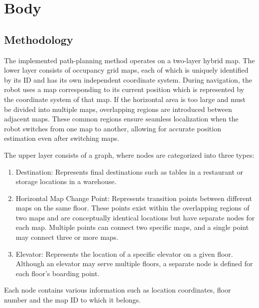 \documentclass[en]{snu-cse-bsc-thesis}
\begin{document}



\chapter{Body}\label{chap:body}

\section{Methodology}\label{sec:Methodology}
The implemented path-planning method operates on a two-layer hybrid map. 
The lower layer consists of occupancy grid maps, each of which is uniquely identified by its ID and has its own independent coordinate system. 
During navigation, the robot uses a map corresponding to its current position which is represented by the coordinate system of that map. 
If the horizontal area is too large and must be divided into multiple maps, overlapping regions are introduced between adjacent maps. 
These common regions ensure seamless localization when the robot switches from one map to another, allowing for accurate position estimation even after switching maps.

The upper layer consists of a graph, where nodes are categorized into three types:
\begin{enumerate}
  \item Destination: Represents final destinations such as tables in a restaurant or storage locations in a warehouse.
  \item Horizontal Map Change Point: Represents transition points between different maps on the same floor. These points exist within the overlapping regions of two maps and are conceptually identical locations but have separate nodes for each map. Multiple points can connect two specific maps, and a single point may connect three or more maps.
  \item Elevator: Represents the location of a specific elevator on a given floor. Although an elevator may serve multiple floors, a separate node is defined for each floor's boarding point.
\end{enumerate}
Each node contains various information such as location coordinates, floor number and the map ID to which it belongs.
\end{document}
